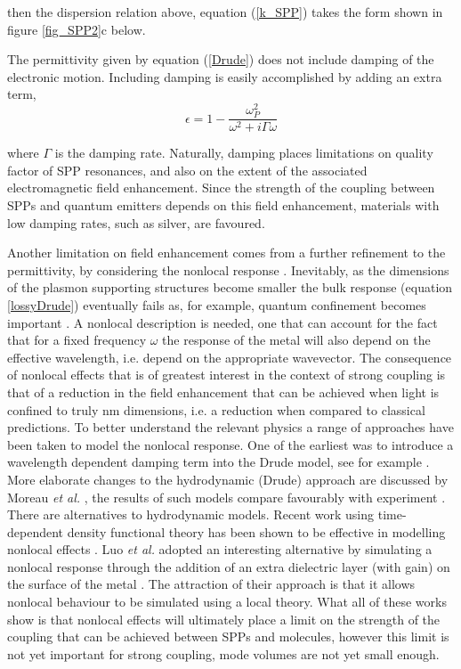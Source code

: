 \documentclass[12pt]{iopart}
\begin{document}
\noindent then the dispersion relation above, equation (\ref{k_SPP}) takes the form shown in figure \ref{fig_SPP2}c below. 

The permittivity given by equation (\ref{Drude}) does not include damping of the electronic motion. Including damping is easily accomplished by adding an extra term,
\\
\begin{equation}
\epsilon=1-\frac{\omega_P^2}{\omega^2+i\Gamma\omega}
\label{lossyDrude}
\end{equation}

\noindent where $\Gamma$ is the damping rate. Naturally, damping places limitations on quality factor of SPP resonances, and also on the extent of the associated electromagnetic field enhancement. Since the strength of the coupling between SPPs and quantum emitters depends on this field enhancement, materials with low damping rates, such as silver,  are favoured. 

Another limitation on field enhancement comes from a further refinement to the permittivity, by considering the nonlocal response \cite{Kreibig_SurfSci_1985_156_678,Abajo_JPCC_2008_112_17983}.
Inevitably, as the dimensions of the plasmon supporting structures become smaller the bulk response (equation \ref{lossyDrude}) eventually fails as, for example, quantum confinement becomes important \cite{KandV, Scholl_Nature_2012_458_421}. A nonlocal description is needed, one that can account for the fact that for a fixed frequency $\omega$ the response of the metal will also depend on the effective wavelength, i.e. depend on the appropriate wavevector. The consequence of nonlocal effects that is of greatest interest in the context of strong coupling is that of a reduction in the field enhancement that can be achieved when light is confined to truly nm dimensions, i.e. a reduction when compared to classical predictions. To better understand the relevant physics a range of approaches have been taken to model the nonlocal response. One of the earliest was to introduce a wavelength dependent damping term into the Drude model, see for example \cite{KandV}. More elaborate changes to the hydrodynamic (Drude) approach are discussed by Moreau {\it et al.} \cite{Moreau_PRB_2013_87_045401}, the results of such models compare favourably with experiment \cite{Ciraci_Science_2012_337_1072}. There are alternatives to hydrodynamic models. Recent work using time-dependent density functional theory has been shown to be effective in modelling nonlocal effects \cite{Zuloaga_ACSNano_2010_4_5669}. Luo {\it et al.} adopted an interesting alternative by simulating a nonlocal response through the addition of an extra dielectric layer (with gain) on the surface of the metal \cite{Luo_PRL_2013_111_093901}. The attraction of their approach is that it allows nonlocal behaviour to be simulated using a local theory. What all of these works show is that nonlocal effects will ultimately place a limit on the strength of the coupling that can be achieved between SPPs and molecules, however this limit is not yet important for strong coupling, mode volumes are not yet small enough.
\end{document}
